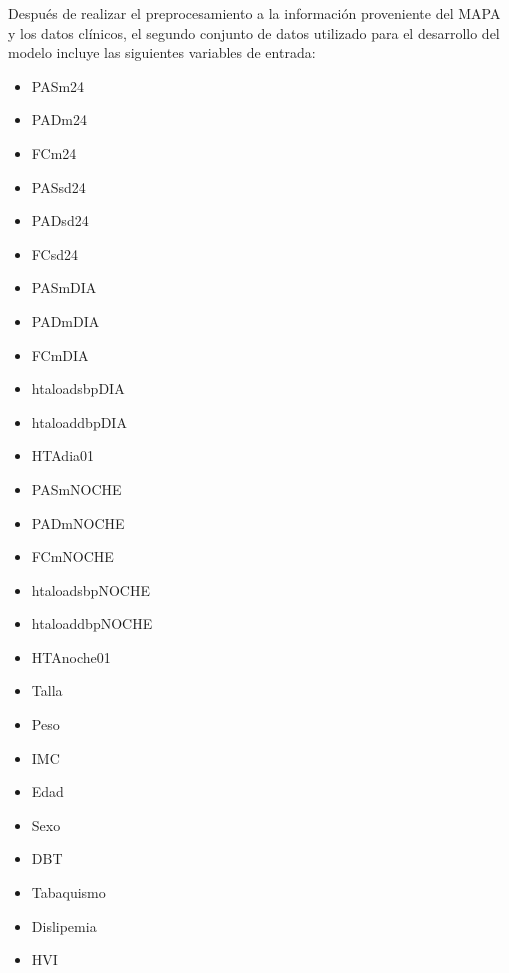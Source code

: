 \filbreak
Después de realizar el preprocesamiento a la información proveniente del MAPA y los datos clínicos, el segundo conjunto de 
datos utilizado para el desarrollo del modelo incluye las siguientes variables de entrada:

\begin{itemize}
  \item PASm24	
  \item PADm24
  \item FCm24
  \item PASsd24 
  \item PADsd24
  \item FCsd24
  \item PASmDIA
  \item PADmDIA
  \item FCmDIA
  \item htaloadsbpDIA 
  \item htaloaddbpDIA   
  \item HTAdia01	
  \item PASmNOCHE
  \item PADmNOCHE
  \item FCmNOCHE
  \item htaloadsbpNOCHE
  \item htaloaddbpNOCHE
  \item HTAnoche01
  \item Talla
  \item Peso
  \item IMC
  \item Edad
  \item Sexo
  \item DBT
  \item Tabaquismo
  \item Dislipemia
  \item HVI
\end{itemize}
